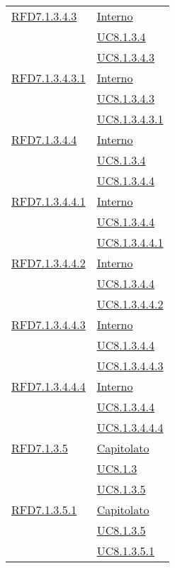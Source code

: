 \begin{longtable}{|>{\centering}m{5cm}|m{5cm}<{\centering}|}
\hyperlink{RFD7.1.3.4.3}{RFD7.1.3.4.3} & \hyperlink{Interno}{Interno}\\
& \hyperref[UC8.1.3.4]{UC8.1.3.4}\\
& \hyperref[UC8.1.3.4.3]{UC8.1.3.4.3}\\ \hline

\hyperlink{RFD7.1.3.4.3.1}{RFD7.1.3.4.3.1} & \hyperlink{Interno}{Interno}\\
& \hyperref[UC8.1.3.4.3]{UC8.1.3.4.3}\\
& \hyperref[UC8.1.3.4.3.1]{UC8.1.3.4.3.1}\\ \hline

\hyperlink{RFD7.1.3.4.4}{RFD7.1.3.4.4} & \hyperlink{Interno}{Interno}\\
& \hyperref[UC8.1.3.4]{UC8.1.3.4}\\
& \hyperref[UC8.1.3.4.4]{UC8.1.3.4.4}\\ \hline

\hyperlink{RFD7.1.3.4.4.1}{RFD7.1.3.4.4.1} & \hyperlink{Interno}{Interno}\\
& \hyperref[UC8.1.3.4.4]{UC8.1.3.4.4}\\
& \hyperref[UC8.1.3.4.4.1]{UC8.1.3.4.4.1}\\ \hline

\hyperlink{RFD7.1.3.4.4.2}{RFD7.1.3.4.4.2} & \hyperlink{Interno}{Interno}\\
& \hyperref[UC8.1.3.4.4]{UC8.1.3.4.4}\\
& \hyperref[UC8.1.3.4.4.2]{UC8.1.3.4.4.2}\\ \hline

\hyperlink{RFD7.1.3.4.4.3}{RFD7.1.3.4.4.3} & \hyperlink{Interno}{Interno}\\
& \hyperref[UC8.1.3.4.4]{UC8.1.3.4.4}\\
& \hyperref[UC8.1.3.4.4.3]{UC8.1.3.4.4.3}\\ \hline

\hyperlink{RFD7.1.3.4.4.4}{RFD7.1.3.4.4.4} & \hyperlink{Interno}{Interno}\\
& \hyperref[UC8.1.3.4.4]{UC8.1.3.4.4}\\
& \hyperref[UC8.1.3.4.4.4]{UC8.1.3.4.4.4}\\ \hline

\hyperlink{RFD7.1.3.5}{RFD7.1.3.5} & \hyperlink{Capitolato}{Capitolato}\\
& \hyperref[UC8.1.3]{UC8.1.3}\\
& \hyperref[UC8.1.3.5]{UC8.1.3.5}\\ \hline

\hyperlink{RFD7.1.3.5.1}{RFD7.1.3.5.1} & \hyperlink{Capitolato}{Capitolato}\\
& \hyperref[UC8.1.3.5]{UC8.1.3.5}\\
& \hyperref[UC8.1.3.5.1]{UC8.1.3.5.1}\\ \hline


\end{longtable}
